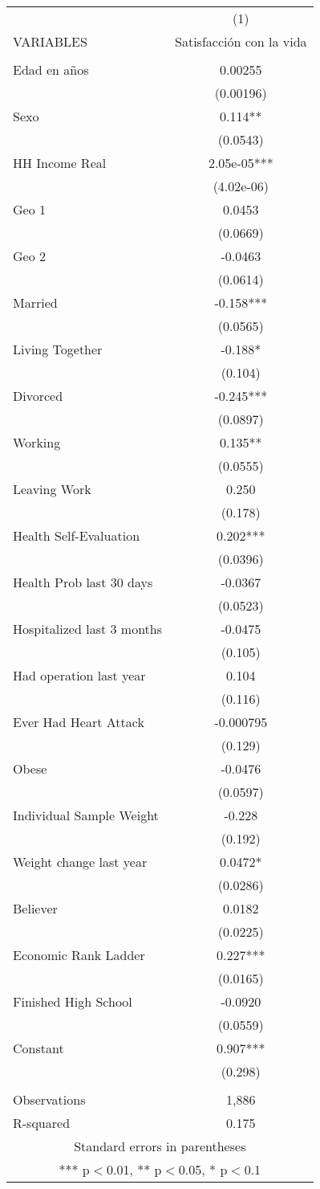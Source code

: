 \documentclass[]{article}
\begin{document}
\begin{tabular}{lc} \hline
 & (1) \\
VARIABLES & Satisfacción con la vida \\ \hline
 &  \\
Edad en años & 0.00255 \\
 & (0.00196) \\
Sexo & 0.114** \\
 & (0.0543) \\
HH Income Real & 2.05e-05*** \\
 & (4.02e-06) \\
Geo 1 & 0.0453 \\
 & (0.0669) \\
Geo 2 & -0.0463 \\
 & (0.0614) \\
Married & -0.158*** \\
 & (0.0565) \\
Living Together & -0.188* \\
 & (0.104) \\
Divorced & -0.245*** \\
 & (0.0897) \\
Working & 0.135** \\
 & (0.0555) \\
Leaving Work & 0.250 \\
 & (0.178) \\
Health Self-Evaluation & 0.202*** \\
 & (0.0396) \\
Health Prob last 30 days & -0.0367 \\
 & (0.0523) \\
Hospitalized last 3 months & -0.0475 \\
 & (0.105) \\
Had operation last year & 0.104 \\
 & (0.116) \\
Ever Had Heart Attack & -0.000795 \\
 & (0.129) \\
Obese & -0.0476 \\
 & (0.0597) \\
Individual Sample Weight & -0.228 \\
 & (0.192) \\
Weight change last year & 0.0472* \\
 & (0.0286) \\
Believer & 0.0182 \\
 & (0.0225) \\
Economic Rank Ladder & 0.227*** \\
 & (0.0165) \\
Finished High School & -0.0920 \\
 & (0.0559) \\
Constant & 0.907*** \\
 & (0.298) \\
 &  \\
Observations & 1,886 \\
 R-squared & 0.175 \\ \hline
\multicolumn{2}{c}{ Standard errors in parentheses} \\
\multicolumn{2}{c}{ *** p$<$0.01, ** p$<$0.05, * p$<$0.1} \\
\end{tabular}
\end{document}
